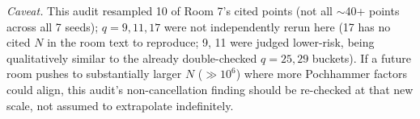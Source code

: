 \textit{Caveat.} This audit resampled 10 of Room 7's cited points (not all $\sim$40+ points
across all 7 seeds); $q=9,11,17$ were not independently rerun here (17 has no cited $N$ in the
room text to reproduce; 9, 11 were judged lower-risk, being qualitatively similar to the already
double-checked $q=25,29$ buckets). If a future room pushes to substantially larger $N$
($\gg10^6$) where more Pochhammer factors could align, this audit's non-cancellation finding
should be re-checked at that new scale, not assumed to extrapolate indefinitely.

